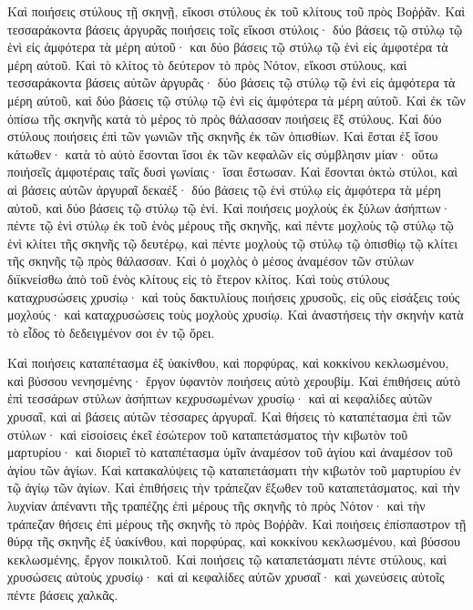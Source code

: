 {Καὶ ποιήσεις στύλους τῇ σκηνῇ, εἴκοσι στύλους ἐκ τοῦ κλίτους τοῦ πρὸς Βοῤῥᾶν.
Καὶ τεσσαράκοντα βάσεις ἀργυρᾶς ποιήσεις τοῖς εἴκοσι στύλοις· δύο βάσεις τῷ στύλῳ τῷ ἑνὶ εἰς ἀμφότερα τὰ μέρη αὐτοῦ· και δύο βάσεις τῷ στύλῳ τῷ ἑνὶ εἰς ἀμφοτέρα τὰ μέρη αὐτοῦ.
Καὶ τὸ κλίτος τὸ δεύτερον τὸ πρὸς Νότον, εἴκοσι στύλους,
καὶ τεσσαράκοντα βάσεις αὐτῶν ἀργυρᾶς· δύο βάσεις τῷ στύλῳ τῷ ἑνὶ εἰς ἀμφότερα τὰ μέρη αὐτοῦ, καὶ δύο βάσεις τῷ στύλῳ τῷ ἑνὶ εἰς ἀμφότερα τὰ μέρη αὐτοῦ.
Καὶ ἐκ τῶν ὀπίσω τῆς σκηνῆς κατὰ τὸ μέρος τὸ πρὸς θάλασσαν ποιήσεις ἓξ στύλους.
Καὶ δύο στύλους ποιήσεις ἐπὶ τῶν γωνιῶν τῆς σκηνῆς ἐκ τῶν ὀπισθίων.
Καὶ ἔσται ἐξ ἴσου κάτωθεν· κατὰ τὸ αὐτὸ ἔσονται ἴσοι ἐκ τῶν κεφαλῶν εἰς σύμβλησιν μίαν· οὕτω ποιήσεῖς ἀμφοτέραις ταῖς δυσὶ γωνίαις· ἴσαι ἔστωσαν.
Καὶ ἔσονται ὀκτὼ στύλοι, καὶ αἱ βάσεις αὐτῶν ἀργυραῖ δεκαέξ· δύο βάσεις τῷ ἑνὶ στύλῳ εἰς ἀμφότερα τὰ μέρη αὐτοῦ, καὶ δύο βάσεις τῷ στύλῳ τῷ ἑνί.
Καὶ ποιήσεις μοχλοὺς ἐκ ξύλων ἀσήπτων· πέντε τῷ ἑνὶ στύλῳ ἐκ τοῦ ἑνὸς μέρους τῆς σκηνῆς,
καὶ πέντε μοχλοὺς τῷ στύλῳ τῷ ἑνὶ κλίτει τῆς σκηνῆς τῷ δευτέρῳ, καὶ πέντε μοχλοὺς τῷ στύλῳ τῷ ὀπισθίῳ τῷ κλίτει τῆς σκηνῆς τῷ πρὸς θάλασσαν.
Καὶ ὁ μοχλὸς ὁ μέσος ἀναμέσον τῶν στύλων διϊκνείσθω ἀπὸ τοῦ ἑνὸς κλίτους εἰς τὸ ἕτερον κλίτος.
Καὶ τοὺς στύλους καταχρυσώσεις χρυσίῳ· καὶ τοὺς δακτυλίους ποιήσεις χρυσοῦς, εἰς οὓς εἰσάξεις τούς μοχλούς· καὶ καταχρυσώσεις τοὺς μοχλοὺς χρυσίῳ.
Καὶ ἀναστήσεις τὴν σκηνὴν κατὰ τὸ εἶδος τὸ δεδειγμένον σοι ἐν τῷ ὄρει.
\par }{\PP {}Καὶ ποιήσεις καταπέτασμα ἐξ ὑακίνθου, καὶ πορφύρας, καὶ κοκκίνου κεκλωσμένου, καὶ βύσσου νενησμένης· ἔργον ὑφαντὸν ποιήσεις αὐτὸ χερουβίμ.
Καὶ ἐπιθήσεις αὐτὸ ἐπὶ τεσσάρων στύλων ἀσήπτων κεχρυσωμένων χρυσίῳ· καὶ αἱ κεφαλίδες αὐτῶν χρυσαῖ, καὶ αἱ βάσεις αὐτῶν τέσσαρες ἀργυραῖ.
Καὶ θήσεις τὸ καταπέτασμα ἐπὶ τῶν στύλων· καὶ εἰσοίσεις ἐκεῖ ἐσώτερον τοῦ καταπετάσματος τὴν κιβωτὸν τοῦ μαρτυρίου· καὶ διοριεῖ τὸ καταπέτασμα ὑμῖν ἀναμέσον τοῦ ἁγίου καὶ ἀναμέσον τοῦ ἁγίου τῶν ἁγίων.
Καὶ κατακαλύψεις τῷ καταπετάσματι τὴν κιβωτὸν τοῦ μαρτυρίου ἐν τῷ ἁγίῳ τῶν ἁγίων.
Καὶ ἐπιθήσεις τὴν τράπεζαν ἔξωθεν τοῦ καταπετάσματος, καὶ τὴν λυχνίαν ἀπέναντι τῆς τραπέζης ἐπὶ μέρους τῆς σκηνῆς τὸ πρὸς Νότον· καὶ τὴν τράπεζαν θήσεις ἐπὶ μέρους τῆς σκηνῆς τὸ πρὸς Βοῤῥᾶν.
Καὶ ποιήσεις ἐπίσπαστρον τῇ θύρᾳ τῆς σκηνῆς ἐξ ὑακίνθου, καὶ πορφύρας, καὶ κοκκίνου κεκλωσμένου, καὶ βύσσου κεκλωσμένης, ἔργον ποικιλτοῦ.
Καὶ ποιήσεις τῷ καταπετάσματι πέντε στύλους, καὶ χρυσώσεις αὐτοὺς χρυσίῳ· καὶ αἱ κεφαλίδες αὐτῶν χρυσαῖ· καὶ χωνεύσεις αὐτοῖς πέντε βάσεις χαλκᾶς.

}
